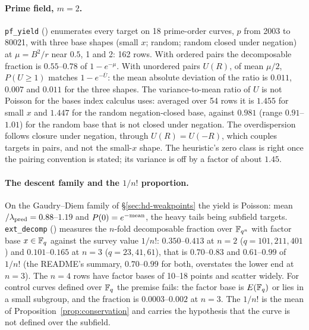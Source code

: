 \paragraph{Prime field, $m=2$.} \texttt{pf\_yield}
()
enumerates every target on 18 prime-order curves, $p$ from 2003 to 80021,
with three base shapes (small $x$; random; random closed under negation) at
$\mu=B^2/r$ near $0.5$, 1 and 2: 162 rows. With ordered pairs the
decomposable fraction is $0.55$--$0.78$ of $1-e^{-\mu}$. With unordered
pairs $U(R)$, of mean $\mu/2$, $P(U\ge1)$ matches $1-e^{-\overline U}$: the
mean absolute deviation of the ratio is $0.011$, $0.007$ and $0.011$ for the
three shapes. The variance-to-mean ratio of $U$ is not Poisson for the bases
index calculus uses: averaged over 54 rows it is $1.455$ for small $x$ and
$1.447$ for the random negation-closed base, against $0.981$ (range
$0.91$--$1.01$) for the random base that is not closed under negation. The
overdispersion follows closure under negation, through $U(R)=U(-R)$, which
couples targets in pairs, and not the small-$x$ shape. The heuristic's zero
class is right once the pairing convention is stated; its variance is off by
a factor of about $1.45$.

\paragraph{The descent family and the $1/n!$ proportion.} On the
Gaudry--Diem family of \S\ref{sec:hd-weakpoints} the yield is Poisson:
mean$/\lambda_{\rm pred}=0.88$--$1.19$ and $P(0)=e^{-\rm mean}$, the heavy
tails being subfield targets. \texttt{ext\_decomp}
()
measures the $n$-fold decomposable fraction over $\mathbb{F}_{q^n}$ with factor base
$x\in\mathbb{F}_q$ against the survey value $1/n!$: $0.350$--$0.413$ at $n=2$
($q=101,211,401$) and $0.101$--$0.165$ at $n=3$ ($q=23,41,61$), that is
$0.70$--$0.83$ and $0.61$--$0.99$ of $1/n!$ (the README's summary,
$0.70$--$0.99$ for both, overstates the lower end at $n=3$). The $n=4$ rows
have factor bases of 10--18 points and scatter widely. For control curves
defined over $\mathbb{F}_q$ the premise fails: the factor base is $E(\mathbb{F}_q)$ or lies
in a small subgroup, and the fraction is $0.0003$--$0.002$ at $n=3$. The
$1/n!$ is the mean of Proposition~\ref{prop:conservation} and carries the
hypothesis that the curve is not defined over the subfield.

